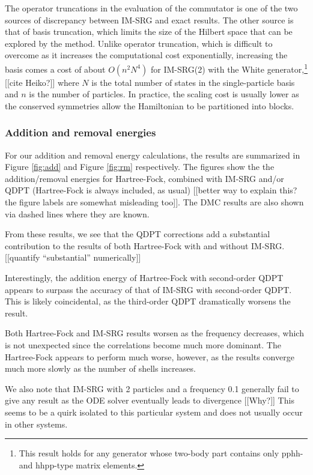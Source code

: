 The operator truncations in the evaluation of the commutator is one of the two sources of discrepancy between IM-SRG and exact results.  The other source is that of basis truncation, which limits the size of the Hilbert space that can be explored by the method.  Unlike operator truncation, which is difficult to overcome as it increases the computational cost exponentially, increasing the basis comes a cost of about $O(n^2 N^4)$ for IM-SRG(2) with the White generator,\footnote{This result holds for any generator whose two-body part contains only pphh- and hhpp-type matrix elements.} [[cite Heiko?]] where $N$ is the total number of states in the single-particle basis and $n$ is the number of particles.  In practice, the scaling cost is usually lower as the conserved symmetries allow the Hamiltonian to be partitioned into blocks.

\subsubsection{Addition and removal energies}

For our addition and removal energy calculations, the results are summarized in Figure \ref{fig:add} and Figure \ref{fig:rm} respectively.  The figures show the the addition/removal energies for Hartree-Fock, combined with IM-SRG and/or QDPT (Hartree-Fock is always included, as usual) [[better way to explain this? the figure labels are somewhat misleading too]].  The DMC results are also shown via dashed lines where they are known.

From these results, we see that the QDPT corrections add a substantial contribution to the results of both Hartree-Fock with and without IM-SRG.  [[quantify ``substantial'' numerically]]

Interestingly, the addition energy of Hartree-Fock with second-order QDPT appears to surpass the accuracy of that of IM-SRG with second-order QDPT.  This is likely coincidental, as the third-order QDPT dramatically worsens the result.

Both Hartree-Fock and IM-SRG results worsen as the frequency decreases, which is not unexpected since the correlations become much more dominant.  The Hartree-Fock appears to perform much worse, however, as the results converge much more slowly as the number of shells increases.

We also note that IM-SRG with 2 particles and a frequency 0.1 generally fail to give any result as the ODE solver eventually leads to divergence [[Why?]]  This seems to be a quirk isolated to this particular system and does not usually occur in other systems.

